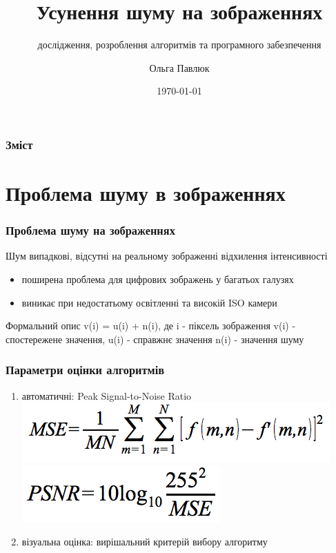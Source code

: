 \documentclass[12pt]{beamer}
\title{Усунення шуму на зображеннях}
\author{Ольга Павлюк\newline {керівник: Роман Кутельмах}}
\subtitle{{ дослідження,  розроблення алгоритмів та програмного забезпечення}}
\institute{Національний університет "Львівська політехніка", кафедра ПЗ}
\date{\today}
\begin{document}
\begin{frame}
	\titlepage
\end{frame}

\begin{frame}
	\frametitle{Зміст} 
	\tableofcontents
\end{frame}

\section{Проблема шуму в зображеннях}
\begin{frame}\frametitle{Проблема шуму на зображеннях}
	\begin{block}{Шум}
	випадкові, відсутні на реальному зображенні відхилення інтенсивності
	\end{block}
	\linebreak 
	\begin{itemize}
		\item поширена проблема для цифрових зображень у багатьох галузях
		\item виникає при недостатьому освітленні та високій ISO камери
	\end{itemize}

	\begin{block}{Формальний опис}
		v(i) = u(i) + n(i), де i - піксель зображення \linebreak
		v(i) - спостережене значення, u(i) - справжнє значення \linebreak
		n(i) - значення шуму 
	\end{block}
\end{frame}


\begin{frame}\frametitle{Параметри оцінки алгоритмів}
	\begin{enumerate}
		\item автоматичні: Peak Signal-to-Noise Ratio \linebreak
		\includegraphics[scale=0.4]{images/mse} \linebreak
		\includegraphics[scale=0.4]{images/psnr} \linebreak
		\item візуальна оцінка: вирішальний критерій вибору алгоритму
	\end{enumerate}
\end{frame}
\end{document}
